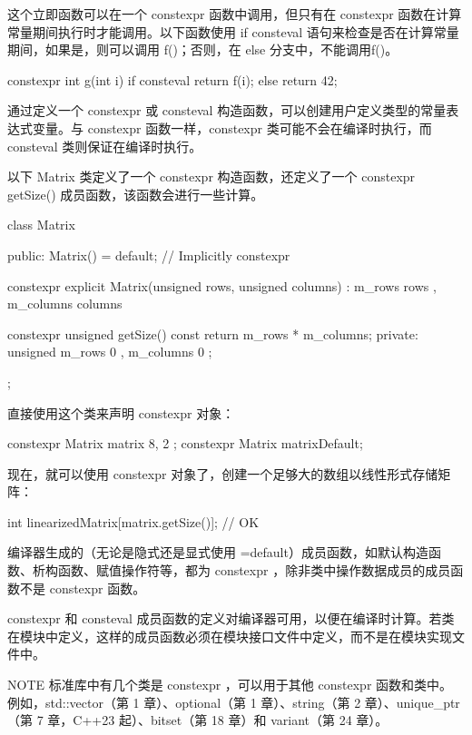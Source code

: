 
这个立即函数可以在一个 constexpr 函数中调用，但只有在 constexpr 函数在计算常量期间执行时才能调用。以下函数使用 if consteval 语句来检查是否在计算常量期间，如果是，则可以调用 f()；否则，在 else 分支中，不能调用f()。

\begin{cpp}
constexpr int g(int i)
{
    if consteval { return f(i); }
    else { return 42; }
}
\end{cpp}


通过定义一个 constexpr 或 consteval 构造函数，可以创建用户定义类型的常量表达式变量。与 constexpr 函数一样，constexpr 类可能不会在编译时执行，而 consteval 类则保证在编译时执行。

以下 Matrix 类定义了一个 constexpr 构造函数，还定义了一个 constexpr getSize() 成员函数，该函数会进行一些计算。

\begin{cpp}
class Matrix
{
    public:
        Matrix() = default; // Implicitly constexpr

        constexpr explicit Matrix(unsigned rows, unsigned columns)
            : m_rows { rows }, m_columns { columns } { }

        constexpr unsigned getSize() const { return m_rows * m_columns; }
    private:
        unsigned m_rows { 0 }, m_columns { 0 };
};
\end{cpp}

直接使用这个类来声明 constexpr 对象：

\begin{cpp}
constexpr Matrix matrix { 8, 2 };
constexpr Matrix matrixDefault;
\end{cpp}

现在，就可以使用 constexpr 对象了，创建一个足够大的数组以线性形式存储矩阵：

\begin{cpp}
int linearizedMatrix[matrix.getSize()]; // OK
\end{cpp}

编译器生成的（无论是隐式还是显式使用 =default）成员函数，如默认构造函数、析构函数、赋值操作符等，都为 constexpr ，除非类中操作数据成员的成员函数不是 constexpr 函数。

constexpr 和 consteval 成员函数的定义对编译器可用，以便在编译时计算。若类在模块中定义，这样的成员函数必须在模块接口文件中定义，而不是在模块实现文件中。

\begin{myNotic}{NOTE}
标准库中有几个类是 constexpr ，可以用于其他 constexpr 函数和类中。例如，std::vector（第 1 章）、optional（第 1 章）、string（第 2 章）、unique\_ptr（第 7 章，C++23 起）、bitset（第 18 章）和 variant（第 24 章）。
\end{myNotic}












